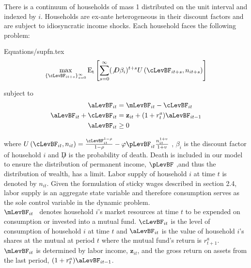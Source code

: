 \documentclass[titlepage]{\econtex}\providecommand{\texname}{BufferStockTheory}
\providecommand{\EqDir}{Equations}
\begin{document}
There is a continuum of households of mass 1 distributed on the unit
interval and indexed by $i$. Households are ex-ante heterogeneous in their discount factors and are subject to idiosyncratic income shocks.  Each household faces the following problem:

\begin{verbatimwrite}{\EqDir/supfn.tex}
\begin{eqnarray}
  \label{eq:supfn}
  \max_{\{\cLevBF_{it+s}\}_{s=0}^{\infty}} \mathrm{E_{t}}\left[\sum_{s=0}^{\infty} (\not D \beta_{i})^{t+s} U\left(  \cLevBF_{i t+s}, n_{i t+s}\right)\right]
\end{eqnarray}
\end{verbatimwrite}
 

subject to 
\begin{align*}
\aLevBF_{it}     &= \mLevBF_{it} - \cLevBF_{it}   \label{eq:DBCparts} \\
\aLevBF_{it} +\cLevBF_{it}    &= \mathbf{z}_{it} +   (1 + r^{a}_{t} ) \aLevBF_{it-1}   \\ 
\aLevBF_{it}  &\geq 0 \\
\end{align*}

where
$U\left(\cLevBF_{i t}, n_{i t}\right) = \frac{\cLevBF_{i t}^{1-\rho}}{1 -\rho} - \varphi \pLevBF_{it} \frac{n_{it}^{1+v}}{1+v}$ , $\beta_{i}$ is the discount factor of household $i$ and $\not D$ is the probability of death. Death is included in our model to ensure the distribution of permanent income, $\pLevBF$ ,and thus the distribution of wealth, has a limit.  Labor supply of household $i$ at time $t$ is denoted by $n_{it}$.  Given the formulation of sticky wages described in section 2.4, labor supply is an aggregate state variable and therefore consumption serves as the sole control variable in the dynamic problem.  \\

$\mLevBF_{it}$ \ denotes household $i$'s market resources at time $t$ to be expended on consumption or invested into a mutual fund. $\cLevBF_{it}$ is the level of consumption of household $i$ at time $t$ and  $ \aLevBF_{it}$ is the value of household $i$'s shares at the mutual at period $t$ where the mutual fund's return is $r_{t+1}^{a}$.  $\mLevBF_{it}$ is determined by labor income,  $\mathbf{z}_{it}$, and the gross return on assets from the last period, $(1+r_{t}^{a}) \aLevBF_{it-1} $.  \\
\end{document}
